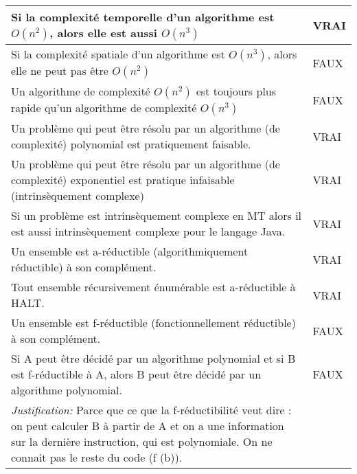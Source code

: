 \begin{longtable}{p{13cm}|l}
    Si la complexité temporelle d'un algorithme est $O(n^{2})$, alors elle est aussi $O(n^{3})$ & VRAI \\
    \hline
    Si la complexité spatiale d'un algorithme est $O(n^{3})$, alors elle ne peut pas être $O(n^{2})$  & FAUX \\
    \hline
    Un algorithme de complexité $O(n^{2})$ est toujours plus rapide qu'un algorithme de complexité $O(n^{3})$ & FAUX \\
    \hline
    Un problème qui peut être résolu par un algorithme (de complexité) polynomial est pratiquement faisable. & VRAI \\
    \hline
    Un problème qui peut être résolu par un algorithme (de complexité) exponentiel est pratique infaisable (intrinsèquement complexe) & VRAI \\
    \hline
    Si un problème est intrinsèquement complexe en MT alors il est aussi intrinsèquement complexe pour le langage Java.& VRAI\\
    \hline
    Un ensemble est a-réductible (algorithmiquement réductible) à son complément.& VRAI\\
    \hline
    Tout ensemble récursivement énumérable est a-réductible à HALT. & VRAI\\
    \hline
    Un ensemble est f-réductible (fonctionnellement réductible) à son complément. & FAUX \\
    \hline
    Si A peut être décidé par un algorithme polynomial et si B est f-réductible à A, alors B peut être décidé par un algorithme polynomial. & FAUX \\
    \textit{Justification:} Parce que ce que la f-réductibilité veut dire : on peut calculer B à partir de A et on a une information sur la dernière instruction, qui est polynomiale. On ne connait pas le reste du code (f (b)). &\\
\end{longtable}